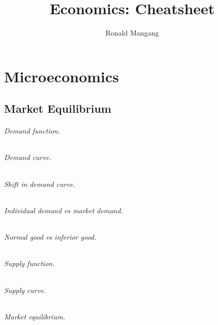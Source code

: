 \documentclass[12pt,english,oneside]{scrbook}
\numberwithin{equation}{chapter}
\theoremstyle{definition}
\theoremstyle{plain}
\begin{document}
\title{Economics: Cheatsheet}
\author{Ronald Mangang}

\maketitle
\tableofcontents

\thispagestyle{empty}
\newpage
{}

\part{Microeconomics}

\chapter{Market Equilibrium}

\paragraph{Demand function.}

\paragraph{Demand curve.}

\paragraph{Shift in demand curve.}

\paragraph{Individual demand vs market demand.}

\paragraph{Normal good vs inferior good.}

\paragraph{Supply function.}

\paragraph{Supply curve.}

\paragraph{Market equilibrium.}
\end{document}
